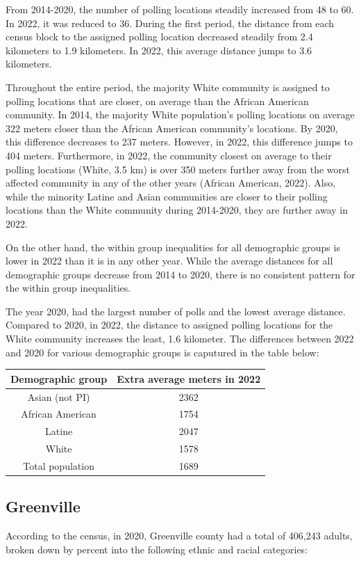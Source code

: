 \documentclass[11pt]{article}
\theoremstyle{remark}
\theoremstyle{definition}
\begin{document}
From 2014-2020, the number of polling locations steadily increased from 48 to 60. In 2022, it was reduced to 36. During the first period, the distance from each census block to the assigned polling location decreased steadily from 2.4 kilometers to 1.9 kilometers. In 2022, this average distance jumps to 3.6 kilometers. 

Throughout the entire period, the majority White community is assigned to polling locations that are closer, on average than the African American community. In 2014, the majority White population's polling locations on average 322 meters closer than the African American community's locations. By 2020, this difference decreases to 237 meters. However, in 2022, this difference jumps to 404 meters. Furthermore, in 2022, the community closest on average to their polling locations (White, 3.5 km) is over 350 meters further away from the worst affected community in any of the other years (African American, 2022). Also, while the minority Latine and Asian communities are closer to their polling locations than the White community during 2014-2020, they are further away in 2022.

On the other hand, the within group inequalities for all demographic groups is lower in 2022 than it is in any other year. While the average distances for all demographic groups decrease from 2014 to 2020, there is no consistent pattern for the within group inequalities.

The year 2020, had the largest number of polls and the lowest average distance. Compared to 2020, in 2022, the distance to assigned polling locations for the White community increases the least, 1.6 kilometer. The differences between 2022 and 2020 for various demographic groups is caputured in the table below:

\begin{tabular}{|c|c|}
	\hline
	Demographic group & Extra average meters in 2022 \\ \hline
	Asian (not PI) &   2362 \\ \hline
	African American &   1754  \\ \hline
	Latine & 2047 \\ \hline
	White &  1578\\ \hline
	Total population &  1689\\ \hline
\end{tabular}


\subsection{Greenville \label{sec:Greenville distances}}
According to the census, in 2020, Greenville county had a total of 406,243 adults, broken down by percent into the following ethnic and racial categories:
\end{document}
